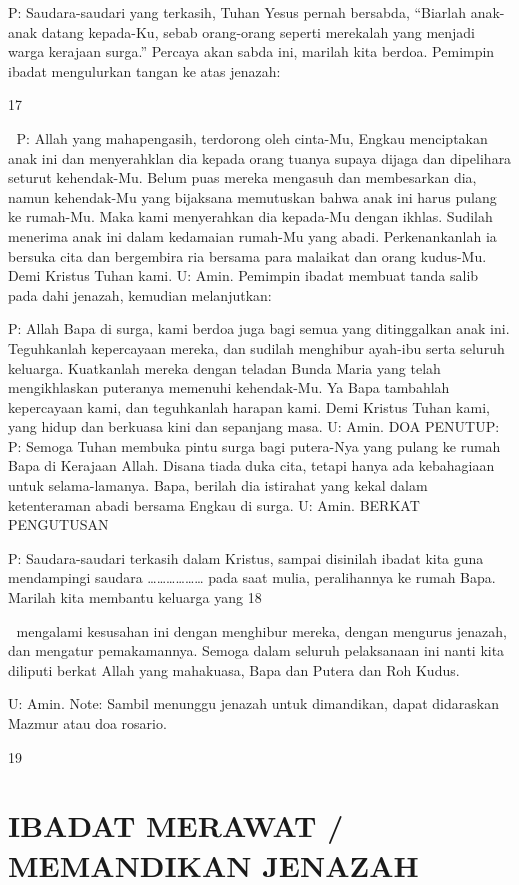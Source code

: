 \documentclass[10pt,a5paper,fancyhdr]{memoir}
\begin{document}
P: Saudara-saudari yang terkasih, Tuhan Yesus pernah bersabda, 
“Biarlah anak-anak datang kepada-Ku, sebab orang-orang seperti 
merekalah yang menjadi warga kerajaan surga.” Percaya akan sabda 
ini, marilah kita berdoa. 
Pemimpin ibadat mengulurkan tangan ke atas jenazah: 

17 



P: Allah yang mahapengasih, terdorong oleh cinta-Mu, Engkau 
menciptakan anak ini dan menyerahklan dia kepada orang tuanya 
supaya dijaga dan dipelihara seturut kehendak-Mu. Belum puas 
mereka mengasuh dan membesarkan dia, namun kehendak-Mu yang 
bijaksana memutuskan bahwa anak ini harus pulang ke rumah-Mu. 
Maka kami menyerahkan dia kepada-Mu dengan ikhlas. Sudilah 
menerima anak ini dalam kedamaian rumah-Mu yang abadi. 
Perkenankanlah ia bersuka cita dan bergembira ria bersama para 
malaikat dan orang kudus-Mu. Demi Kristus Tuhan kami. 
U: Amin. 
Pemimpin ibadat membuat tanda salib pada dahi jenazah, kemudian 
melanjutkan: 

P: Allah Bapa di surga, kami berdoa juga bagi semua yang 
ditinggalkan anak ini. Teguhkanlah kepercayaan mereka, dan sudilah 
menghibur ayah-ibu serta seluruh keluarga. Kuatkanlah mereka 
dengan teladan Bunda Maria yang telah mengikhlaskan puteranya 
memenuhi kehendak-Mu. Ya Bapa tambahlah kepercayaan kami, dan 
teguhkanlah harapan kami. Demi Kristus Tuhan kami, yang hidup 
dan berkuasa kini dan sepanjang masa. 
U: Amin. 
DOA PENUTUP: 
P: Semoga Tuhan membuka pintu surga bagi putera-Nya yang pulang 
ke rumah Bapa di Kerajaan Allah. Disana tiada duka cita, tetapi 
hanya ada kebahagiaan untuk selama-lamanya. Bapa, berilah dia 
istirahat yang kekal dalam ketenteraman abadi bersama Engkau di 
surga. 
U: Amin. 
BERKAT PENGUTUSAN 

P: Saudara-saudari terkasih dalam Kristus, sampai disinilah ibadat 
kita guna mendampingi saudara ……………… pada saat mulia, 
peralihannya ke rumah Bapa. Marilah kita membantu keluarga yang 
18 



mengalami kesusahan ini dengan menghibur mereka, dengan 
mengurus jenazah, dan mengatur pemakamannya. Semoga dalam 
seluruh pelaksanaan ini nanti kita diliputi berkat Allah yang 
mahakuasa, Bapa dan Putera dan Roh Kudus. 

U: Amin. 
Note: Sambil menunggu jenazah untuk dimandikan, dapat didaraskan 
Mazmur atau doa rosario. 

19 



\chapter{IBADAT MERAWAT / MEMANDIKAN JENAZAH} 
\end{document}
